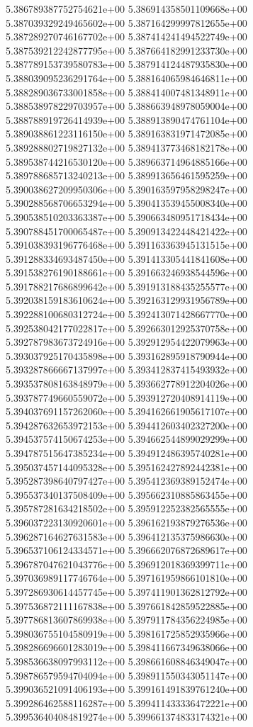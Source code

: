 5.386789387752754621e+00
5.386914358501109668e+00
5.387039329249465602e+00
5.387164299997812655e+00
5.387289270746167702e+00
5.387414241494522749e+00
5.387539212242877795e+00
5.387664182991233730e+00
5.387789153739580783e+00
5.387914124487935830e+00
5.388039095236291764e+00
5.388164065984646811e+00
5.388289036733001858e+00
5.388414007481348911e+00
5.388538978229703957e+00
5.388663948978059004e+00
5.388788919726414939e+00
5.388913890474761104e+00
5.389038861223116150e+00
5.389163831971472085e+00
5.389288802719827132e+00
5.389413773468182178e+00
5.389538744216530120e+00
5.389663714964885166e+00
5.389788685713240213e+00
5.389913656461595259e+00
5.390038627209950306e+00
5.390163597958298247e+00
5.390288568706653294e+00
5.390413539455008340e+00
5.390538510203363387e+00
5.390663480951718434e+00
5.390788451700065487e+00
5.390913422448421422e+00
5.391038393196776468e+00
5.391163363945131515e+00
5.391288334693487450e+00
5.391413305441841608e+00
5.391538276190188661e+00
5.391663246938544596e+00
5.391788217686899642e+00
5.391913188435255577e+00
5.392038159183610624e+00
5.392163129931956789e+00
5.392288100680312724e+00
5.392413071428667770e+00
5.392538042177022817e+00
5.392663012925370758e+00
5.392787983673724916e+00
5.392912954422079963e+00
5.393037925170435898e+00
5.393162895918790944e+00
5.393287866667137997e+00
5.393412837415493932e+00
5.393537808163848979e+00
5.393662778912204026e+00
5.393787749660559072e+00
5.393912720408914119e+00
5.394037691157262060e+00
5.394162661905617107e+00
5.394287632653972153e+00
5.394412603402327200e+00
5.394537574150674253e+00
5.394662544899029299e+00
5.394787515647385234e+00
5.394912486395740281e+00
5.395037457144095328e+00
5.395162427892442381e+00
5.395287398640797427e+00
5.395412369389152474e+00
5.395537340137508409e+00
5.395662310885863455e+00
5.395787281634218502e+00
5.395912252382565555e+00
5.396037223130920601e+00
5.396162193879276536e+00
5.396287164627631583e+00
5.396412135375986630e+00
5.396537106124334571e+00
5.396662076872689617e+00
5.396787047621043776e+00
5.396912018369399711e+00
5.397036989117746764e+00
5.397161959866101810e+00
5.397286930614457745e+00
5.397411901362812792e+00
5.397536872111167838e+00
5.397661842859522885e+00
5.397786813607869938e+00
5.397911784356224985e+00
5.398036755104580919e+00
5.398161725852935966e+00
5.398286696601283019e+00
5.398411667349638066e+00
5.398536638097993112e+00
5.398661608846349047e+00
5.398786579594704094e+00
5.398911550343051147e+00
5.399036521091406193e+00
5.399161491839761240e+00
5.399286462588116287e+00
5.399411433336472221e+00
5.399536404084819274e+00
5.399661374833174321e+00
